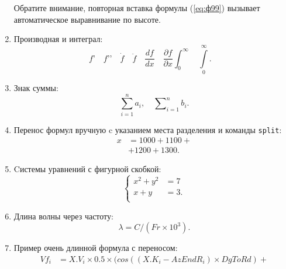 \begin{enumerate}
Обратите внимание, повторная вставка формулы (\ref{eq:ф99}) вызывает автоматическое выравнивание по высоте.
\item Производная и интеграл:
{\zerodisplayskips
	\begin{equation}	
	f’\quad f’’\quad
	\dot{f}\quad \ddot{f} \quad
	\frac{d f}{d x}\quad
	\frac{\partial f}{\partial x}
	\int_0^{\infty}\quad
	\int\limits_0^{\infty}.\quad
	\label{eq:ф10}
	\end{equation}
}%
\item Знак суммы:
{\zerodisplayskips
	\begin{equation}	
	\sum_{i=1}^n a_i,\quad
	\sum\nolimits_{i=1}^n b_i.
	\label{eq:ф11}
	\end{equation}
}
\item Перенос формул вручную c указанием места разделения и команды \verb=split=:
{\zerodisplayskips
	\begin{equation}	
	\begin{split}
	x&=1000+1100+{}\\
	 &+1200+1300.
	\end{split}
	\label{eq:ф12}
	\end{equation}
}
\item Cистемы уравнений с фигурной скобкой:
{%
	\begin{equation}	
	\left\{
	\begin{aligned}
	x^2+y^2&=7 \\
	x+y & = 3. \\
	\end{aligned}
	\right.
	\end{equation}
}
\item Длина волны через частоту:
{\zerodisplayskips
	\begin{equation}	
	\lambda=C/(Fr \times 10^3).
	\end{equation}
}
\item Пример очень длинной формула с переносом:
{\zerodisplayskips
	\begin{equation}
	\begin{split}	
	Vf_i&=X.V_i\times 0.5 \times (cos((X.K_i - AzEndR_i)\times DgToRd) +{}\\

\end{split}
\end{equation}}
\end{enumerate}
